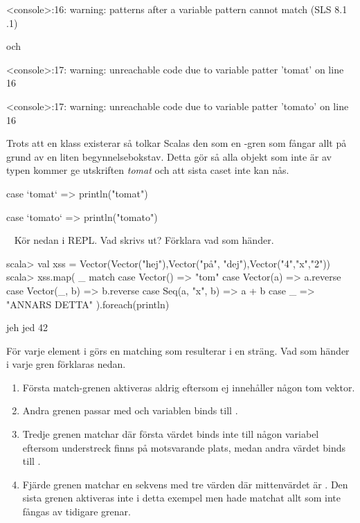 \SubtaskSolved
\begin{REPL}
<console>:16: warning: patterns after a variable pattern cannot match (SLS 8.1
.1)
\end{REPL}
och
\ifswedish
\begin{REPL}
<console>:17: warning: unreachable code due to variable patter 'tomat' on line
16
\end{REPL}
\else
\begin{REPL}
<console>:17: warning: unreachable code due to variable patter 'tomato' on line
16
\end{REPL}
\fi
Trots att en klass \ifswedish{}\else{}\fi{} existerar så tolkar Scalas  den som en -gren som fångar allt på grund av en liten begynnelsebokstav. Detta gör så alla objekt som inte är av typen \ifswedish{}\else{}\fi{} kommer ge utskriften \textit{tomat} och att sista caset inte kan nås.

\SubtaskSolved
\ifswedish
\begin{Code}
case `tomat` => println("tomat")
\end{Code}
\else
\begin{Code}
case `tomato` => println("tomato")
\end{Code}
\fi



\QUESTEND






\QUESTBEGIN

\Task \what ~ Kör nedan i REPL. Vad skrivs ut? Förklara vad som händer.
\begin{REPL}
scala> val xss = Vector(Vector("hej"),Vector("på", "dej"),Vector("4","x","2"))
scala> xss.map( _ match
  case Vector() => "tom"
  case Vector(a) => a.reverse
  case Vector(_, b) => b.reverse
  case Seq(a, "x", b) => a + b
  case _ => "ANNARS DETTA"
  ).foreach(println)
\end{REPL}


\SOLUTION

\TaskSolved \what

\begin{REPL}
jeh
jed
42
\end{REPL}
För varje element i  görs en matching som resulterar i en sträng. Vad som händer i varje gren förklaras nedan.
\begin{enumerate}
  \item Första match-grenen aktiveras aldrig eftersom  ej innehåller någon tom vektor.
  \item Andra grenen passar med  och variablen  binds till .
  \item Tredje grenen matchar  där första värdet binds inte till någon variabel eftersom understreck finns på motsvarande plats, medan andra värdet binds till .
  \item Fjärde grenen matchar en sekvens med tre värden där mittenvärdet är . Den sista grenen aktiveras inte i detta exempel men hade matchat allt som inte fångas av tidigare grenar.
\end{enumerate}

